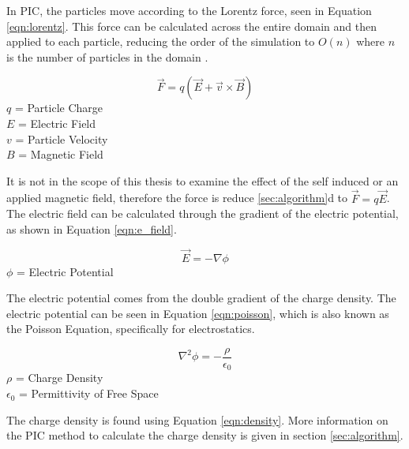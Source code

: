 \indent In PIC, the particles move according to the Lorentz force, seen in Equation \ref{eqn:lorentz}. This force can be calculated across the entire domain and then applied to each particle, reducing the order of the simulation to \(O(n)\) where \(n\) is the number of particles in the domain \cite{es-pic}. \par

\begin{equation}
    \label{eqn:lorentz}
    \vec{F} = q (\vec{E} + \vec{v}  \times \vec{B})
\end{equation}
\(q\) = Particle Charge \\
\(E\) = Electric Field \\
\(v\) = Particle Velocity \\
\(B\) = Magnetic Field \par

\indent It is not in the scope of this thesis to examine the effect of the self induced or an applied magnetic field, therefore the force is reduce \ref{sec:algorithm}d to \(\vec{F} = q \vec{E}\). The electric field can be calculated through the gradient of the electric potential, as shown in Equation \ref{eqn:e_field}. \par


\begin{equation}
    \label{eqn:e_field}
    \vec{E} = - \nabla \phi
\end{equation}
\(\phi\) = Electric Potential \par

\indent The electric potential comes from the double gradient of the charge density. The electric potential can be seen in Equation \ref{eqn:poisson}, which is also known as the Poisson Equation, specifically for electrostatics. \par

\begin{equation}
    \label{eqn:poisson}
    \nabla^2 \phi = - \frac{\rho}{\epsilon_0}
\end{equation}
\(\rho\) = Charge Density \\
\(\epsilon_0\) = Permittivity of Free Space \par

\indent The charge density is found using Equation \ref{eqn:density}. More information on the PIC method to calculate the charge density is given in section \ref{sec:algorithm}. \par

